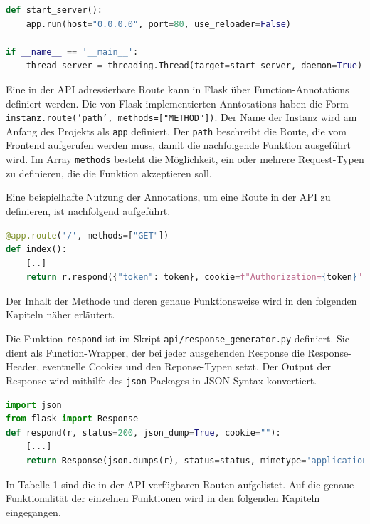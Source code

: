 \begin{lstlisting}[language=Python, caption={Flask im eigenen Thread starten}]
def start_server():
    app.run(host="0.0.0.0", port=80, use_reloader=False)

if __name__ == '__main__':
    thread_server = threading.Thread(target=start_server, daemon=True).start()
\end{lstlisting}

Eine in der API adressierbare Route kann in Flask über Function-Annotations definiert werden. Die von Flask implementierten Anntotations haben die Form \texttt{instanz.route('path', methods=["METHOD"])}. Der Name der Instanz wird am Anfang des Projekts als \texttt{app} definiert. Der \texttt{path} beschreibt die Route, die vom Frontend aufgerufen werden muss, damit die nachfolgende Funktion ausgeführt wird. Im Array \texttt{methods} besteht die Möglichkeit, ein oder mehrere Request-Typen zu definieren, die die Funktion akzeptieren soll.

Eine beispielhafte Nutzung der Annotations, um eine Route in der API zu definieren, ist nachfolgend aufgeführt. 

\begin{lstlisting}[language=Python, caption={Beispiel einer API-Routendefinition über Annotations}]
@app.route('/', methods=["GET"])
def index():
    [..]
    return r.respond({"token": token}, cookie=f"Authorization={token}")
\end{lstlisting}

Der Inhalt der Methode und deren genaue Funktionsweise wird in den folgenden Kapiteln näher erläutert.

Die Funktion \texttt{respond} ist im Skript \texttt{api/response\_{}generator.py} definiert. Sie dient als Function-Wrapper, der bei jeder ausgehenden Response die Response-Header, eventuelle Cookies und den Reponse-Typen setzt. Der Output der Response wird mithilfe des \texttt{json} Packages in JSON-Syntax konvertiert.

\begin{lstlisting}[language=Python, caption={Respond Funktion zur Rückgabe von JSON-Responses}]
import json
from flask import Response
def respond(r, status=200, json_dump=True, cookie=""):
    [...]
    return Response(json.dumps(r), status=status, mimetype='application/json', headers=headers)
\end{lstlisting}

In Tabelle 1 sind die in der API verfügbaren Routen aufgelistet. Auf die genaue Funktionalität der einzelnen Funktionen wird in den folgenden Kapiteln eingegangen.

